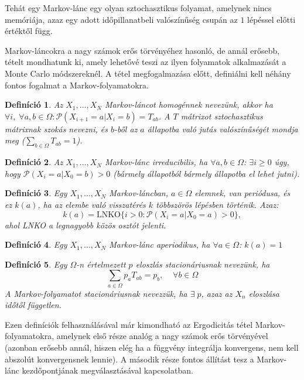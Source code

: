 \documentclass[11pt,a4paper]{article}
\numberwithin{equation}{subsection}
\numberwithin{figure}{section}
\newtheorem{definition}{Definíció}[section]
\begin{document}
Tehát egy Markov-lánc egy olyan sztochasztikus folyamat, amelynek nincs memóriája, azaz egy adott időpillanatbeli valószínűség csupán az $1$ lépéssel előtti értéktől függ. 

Markov-láncokra a nagy számok erős törvényéhez hasonló, de annál erősebb, tételt mondhatunk ki, amely lehetővé teszi az ilyen folyamatok alkalmazását a Monte Carlo módszereknél. A tétel megfogalmazása előtt, definiálni kell néhány fontos fogalmat a Markov-folyamatokra.

\begin{definition}
Az $X_1,\dots,X_N$ Markov-láncot homogénnek nevezünk, akkor ha $\forall i,\;\forall a,b\in\Omega: \mathcal{P}(X_{i+1}=a|X_{i}=b)=T_{ab}$. A $T$ mátrixot sztochasztikus mátrixnak szokás nevezni, és $b$-ből az $a$ állapotba való jutás valószínűségét mondja meg  ($\sum_{b\in\Omega}T_{ab}=1$).
\end{definition}

\begin{definition}
Az $X_1,\dots,X_N$ Markov-lánc irreducibilis, ha $\forall a,b\in\Omega$: $\exists i\geq 0$ úgy, hogy $\mathcal{P}(X_i=a|X_{0}=b)>0$ (bármely állapotból bármely állapotba el lehet jutni).
\end{definition}

\begin{definition}
Egy $X_1,\dots,X_N$ Markov-láncban, $a\in \Omega$ elemnek, van periódusa, és ez $k(a)$, ha az elembe való visszatérés $k$ többszörös lépésben történik. Azaz:
\begin{equation}
k(a)=\mathrm{LNKO}\{i>0: \mathcal{P}(X_i=a|X_0=a)>0\},
\end{equation} 
ahol LNKO a legnagyobb közös osztót jelenti.
\end{definition}

\begin{definition}
Egy $X_1,\dots,X_N$ Markov-lánc aperiodikus, ha $\forall a\in\Omega$: $k(a)=1$
\end{definition}

\begin{definition}
Egy $\Omega$-n értelmezett $p$ eloszlás stacionáriusnak nevezünk, ha
\begin{equation}
\sum_{a\in\Omega}p_aT_{ab}=p_b,\;\;\;\;\forall b\in\Omega
\end{equation}
A Markov-folyamatot stacionáriusnak nevezzük, ha $\exists\;p$, azaz az $X_n$ eloszlása időtől független.
\end{definition}

Ezen definíciók felhasználásával már kimondható az Ergodicitás tétel Markov-folyamatokra, amelynek első része  analóg a nagy számok erős törvényével (azonban erősebb annál, hiszen elég ha a függvény integrálja konvergens, nem kell abszolút konvergensnek lennie). A második része fontos állítást tesz a Markov-lánc kezdőpontjának megválasztásával kapcsolatban.
\end{document}
